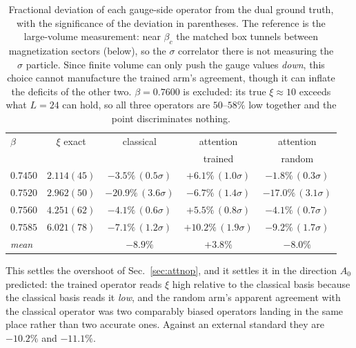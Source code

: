 \documentclass[aps,prl,reprint,superscriptaddress,nofootinbib]{revtex4-2}
\begin{document}
\begin{table}[t]
\caption{Fractional deviation of each gauge-side operator from the dual ground
truth, with the significance of the deviation in parentheses. The reference is
the large-volume measurement: near $\beta_c$ the matched box tunnels between
magnetization sectors (below), so the $\sigma$ correlator there is not measuring
the $\sigma$ particle. Since finite volume can only push the gauge values
\emph{down}, this choice cannot manufacture the trained arm's agreement, though
it can inflate the deficits of the other two. $\beta=0.7600$ is excluded: its
true $\xi\approx10$ exceeds what $L=24$ can hold, so all three operators are
$50$--$58\%$ low together and the point discriminates nothing.}
\label{tab:dual}
\begin{ruledtabular}
\begin{tabular}{lcccc}
$\beta$ & $\xi$ exact & classical & attention & attention\\
        &             &           & trained   & random\\
\colrule
$0.7450$ & $2.114(45)$ & $-3.5\%\,(0.5\sigma)$ & $+6.1\%\,(1.0\sigma)$
         & $-1.8\%\,(0.3\sigma)$\\
$0.7520$ & $2.962(50)$ & $-20.9\%\,(3.6\sigma)$ & $-6.7\%\,(1.4\sigma)$
         & $-17.0\%\,(3.1\sigma)$\\
$0.7560$ & $4.251(62)$ & $-4.1\%\,(0.6\sigma)$ & $+5.5\%\,(0.8\sigma)$
         & $-4.1\%\,(0.7\sigma)$\\
$0.7585$ & $6.021(78)$ & $-7.1\%\,(1.2\sigma)$ & $+10.2\%\,(1.9\sigma)$
         & $-9.2\%\,(1.7\sigma)$\\
\colrule
\emph{mean} & & $\bm{-8.9\%}$ & $\bm{+3.8\%}$ & $\bm{-8.0\%}$\\
\end{tabular}
\end{ruledtabular}
\end{table}

This settles the overshoot of Sec.~\ref{sec:attnop}, and it settles it in the
direction $A_0$ predicted: the trained operator reads $\xi$ high relative to the
classical basis because the classical basis reads it \emph{low}, and the random
arm's apparent agreement with the classical operator was two comparably biased
operators landing in the same place rather than two accurate ones. Against an
external standard they are $-10.2\%$ and $-11.1\%$.
\end{document}
